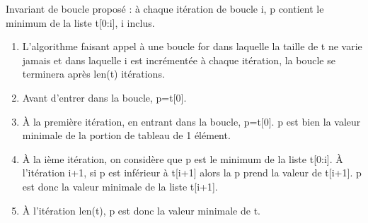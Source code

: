 \documentclass[10pt]{article}
\newif\ifprof
\begin{document}
\ifprof
\begin{corrige}
Invariant de boucle proposé : à chaque itération de boucle \textsf{i}, \textsf{p} contient le minimum de la liste \textsf{t[0:i]}, \textsf{i} inclus.

\begin{enumerate}
\item L'algorithme faisant appel à une boucle for dans laquelle la taille de \textsf{t} ne varie jamais et dans laquelle \textsf{i} est incrémentée à chaque itération, la boucle se terminera après \textsf{len(t)} itérations.
\item Avant d'entrer dans la boucle, \textsf{p=t[0]}.
\item À la première itération, en entrant dans la boucle, \textsf{p=t[0]}. \textsf{p} est bien la valeur minimale de la portion de tableau de 1 élément.
\item À la ième itération, on considère que \textsf{p} est le minimum de la liste \textsf{t[0:i]}. À l'itération \textsf{i+1}, si \textsf{p} est inférieur à \textsf{t[i+1]} alors la \textsf{p} prend la valeur de \textsf{t[i+1]}. \textsf{p} est donc la valeur minimale de la liste \textsf{t[i+1]}.
\item À l'itération \textsf{len(t)}, \textsf{p} est donc la valeur minimale de \textsf{t}.

\end{enumerate}
\end{corrige}
\else
\begin{center}
\begin{tabular}{|p{.95\linewidth}|}
\hline
\vspace{1cm}
\dotfill

\vspace{1cm}
\dotfill

\vspace{1cm}
\dotfill

\vspace{1cm}
\dotfill

\vspace{1cm}
\dotfill

\vspace{1cm}
\dotfill

\vspace{1cm}
\dotfill

\vspace{1cm}
\dotfill

\vspace{1cm}
\dotfill

\vspace{1cm}
\dotfill

\vspace{1cm}
\dotfill

\vspace{1cm}
\dotfill

\vspace{.5cm} \\
\hline
\end{tabular}
\end{center}
\end{document}
